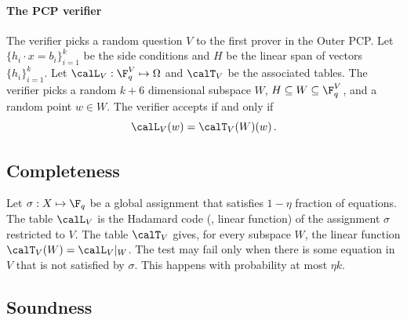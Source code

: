 \paragraph{The PCP verifier}  The verifier picks a random question
$V$ to the first prover in the Outer PCP\@. Let $\{h_i\cdot x = b_i\}_{i=1}^k$ be the side conditions and $H$ be the linear span of vectors $\{h_i\}_{i=1}^k$. Let
$\calL_V: \F_q^V \mapsto \Omega$ and $\calT_V$ be the
associated tables. The verifier picks a random $k+6$ dimensional
subspace $W$, $H \subseteq W \subseteq \F_q^V$, and a random point $w \in W$.
The verifier accepts if and only if
 $$  \calL_V(w) = \calT_V(W) (w)\,. $$

\subsection{Completeness}

Let $\sigma: X \mapsto \F_q$ be a global assignment that satisfies $1-\eta$ fraction
of equations. The table $\calL_V$ is the Hadamard code (\ie, linear function)
of the assignment $\sigma$ restricted
to $V$. The table $\calT_V$ gives, for every subspace $W$, the linear function
$\calT_V(W) = \calL_V|_W$.
The test may fail only when there is some equation in $V$ that is not satisfied
by $\sigma$. This happens with probability at most $\eta k$.



\subsection{Soundness}

